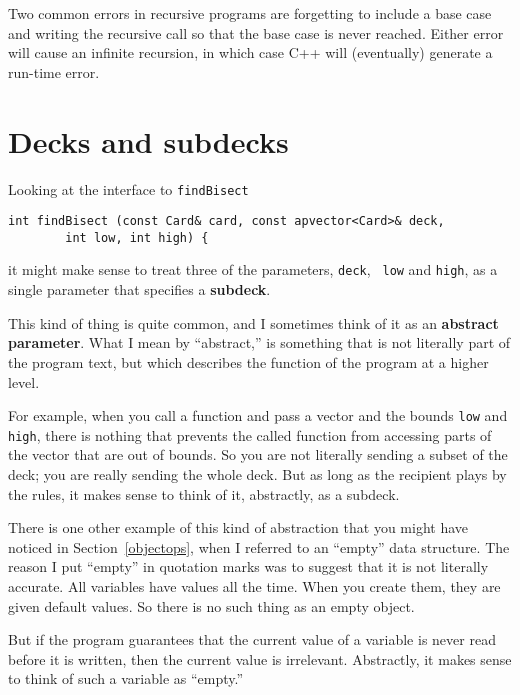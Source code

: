 Two common errors in recursive programs are forgetting to include a
base case and writing the recursive call so that the base case is never
reached.  Either error will cause an infinite recursion, in which case
C++ will (eventually) generate a run-time error.


\section{Decks and subdecks}

Looking at the interface to {\tt findBisect}

\begin{verbatim}
int findBisect (const Card& card, const apvector<Card>& deck,
		int low, int high) {
\end{verbatim}
%
it might make sense to treat three of the parameters, {\tt deck}, {\tt
low} and {\tt high}, as a single parameter that specifies a {\bf
subdeck}.


This kind of thing is quite common, and I sometimes think of it as an
{\bf abstract parameter}.  What I mean by ``abstract,'' is something
that is not literally part of the program text, but which describes the
function of the program at a higher level.

For example, when you call a function and pass a vector and the bounds
{\tt low} and {\tt high}, there is nothing that prevents the called
function from accessing parts of the vector that are out of bounds.  So
you are not literally sending a subset of the deck; you are really
sending the whole deck.  But as long as the recipient plays by the
rules, it makes sense to think of it, abstractly, as a subdeck.

There is one other example of this kind of abstraction that you might
have noticed in Section~\ref{objectops}, when I referred to an
``empty'' data structure.  The reason I put ``empty'' in quotation
marks was to suggest that it is not literally accurate.  All variables
have values all the time.  When you create them, they are given
default values.  So there is no such thing as an empty object.

But if the program guarantees that the current value of a variable is
never read before it is written, then the current value is irrelevant.
Abstractly, it makes sense to think of such a variable as ``empty.''

